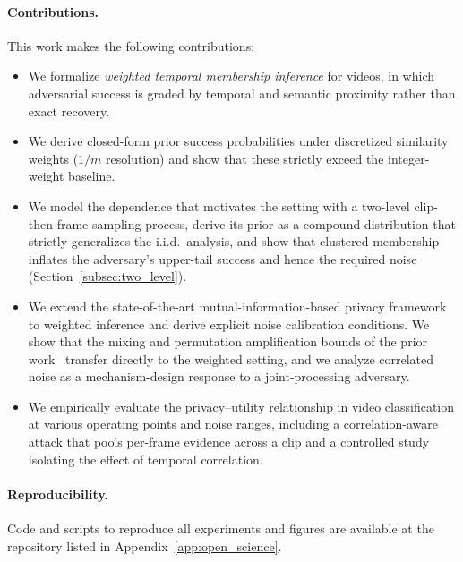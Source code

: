 \documentclass[sigconf,anonymous, review]{acmart}
\begin{document}
\paragraph{Contributions.}
This work makes the following contributions:
\begin{itemize}
    \item We formalize \emph{weighted temporal membership inference} for videos, in which adversarial success is graded by temporal and semantic proximity rather than exact recovery.
    \item We derive closed-form prior success probabilities under discretized similarity weights ($1/m$ resolution) and show that these strictly exceed the integer-weight baseline.
    \item We model the dependence that motivates the setting with a two-level clip-then-frame sampling process, derive its prior as a compound distribution that strictly generalizes the i.i.d.\ analysis, and show that clustered membership inflates the adversary's upper-tail success and hence the required noise (Section~\ref{subsec:two_level}).
    \item We extend the state-of-the-art mutual-information-based privacy framework~\cite{xiao2024formal} to weighted inference and derive explicit noise calibration conditions. We show that the mixing and permutation amplification bounds of the prior work~\cite{xiao2024formal} transfer directly to the weighted setting, and we analyze correlated noise as a mechanism-design response to a joint-processing adversary.
    \item We empirically evaluate the privacy--utility relationship in video classification at various operating points and noise ranges, including a correlation-aware attack that pools per-frame evidence across a clip and a controlled study isolating the effect of temporal correlation.
\end{itemize}

\paragraph{Reproducibility.}
Code and scripts to reproduce all experiments and figures are available at the repository listed in Appendix~\ref{app:open_science}.
\end{document}
